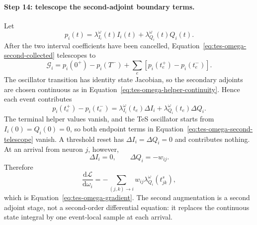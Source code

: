 \paragraph{Step 14: telescope the second-adjoint boundary terms.}
Let
\begin{equation}
    p_i(t)=\lambda_{I_i}^{\omega}(t)I_i(t)
           +\lambda_{Q_i}^{\omega}(t)Q_i(t).
\end{equation}
After the two interval coefficients have been cancelled,
Equation~\eqref{eq:tes-omega-second-collected} telescopes to
\begin{equation}
    \mathcal G_i
      =p_i(0^+)-p_i(T^-)
       +\sum_e\left[p_i(t_e^+)-p_i(t_e^-)\right].
    \label{eq:tes-omega-second-telescope}
\end{equation}
The oscillator transition has identity state Jacobian, so the secondary
adjoints are chosen continuous as in
Equation~\eqref{eq:tes-omega-helper-continuity}. Hence each event contributes
\begin{equation}
    p_i(t_e^+)-p_i(t_e^-)
      =\lambda_{I_i}^{\omega}(t_e)\Delta I_i
       +\lambda_{Q_i}^{\omega}(t_e)\Delta Q_i.
    \label{eq:tes-omega-second-event-term}
\end{equation}
The terminal helper values vanish, and the TeS oscillator starts from
$I_i(0)=Q_i(0)=0$, so both endpoint terms in
Equation~\eqref{eq:tes-omega-second-telescope} vanish. A threshold reset has
$\Delta I_i=\Delta Q_i=0$ and contributes nothing. At an arrival from
neuron $j$, however,
\begin{equation}
    \Delta I_i=0,
    \qquad
    \Delta Q_i=-w_{ij}.
\end{equation}
Therefore
\begin{equation}
    \frac{\mathrm d\mathcal L}{\mathrm d\omega_i}
      =-\sum_{(j,k)\to i}
        w_{ij}\lambda_{Q_i}^{\omega}(t^s_{jk}),
    \label{eq:tes-omega-gradient-derived}
\end{equation}
which is Equation~\eqref{eq:tes-omega-gradient}. The second augmentation is a
second adjoint stage, not a second-order differential equation: it replaces
the continuous state integral by one event-local sample at each arrival.

